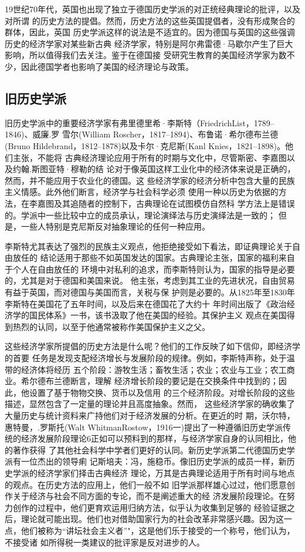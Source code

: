 19世纪70年代，英国也出现了独立于德国历史学派的对正统经典理论的批评，以及对所谓
的历史方法的提倡。然而，历史方法的这些英国提倡者，没有形成聚合的群体，因此，英国
历史学派这样的说法是不适宜的。因为德国与英国的这些强调历史的经济学家对某些新古典
经济学家，特别是阿尔弗雷德·马歇尔产生了巨大影响，所以值得我们去关注。鉴于在德国接
受研究生教育的美国经济学家为数不少，因此德国学者也影响了美国的经济理论与政策。

\subsection{旧历史学派}

旧历史学派中的重要经济学家有弗里德里希·李斯特（FriedrichList，1789--1846)、威廉.罗
雪尔(William Roscher，1817--1894)、布鲁诺·希尔德布兰德(Bruno
Hildebrand，1812--1878)以及卡尔·克尼斯(Kanl Knies，1821--1898)。他们主张，不能将
古典经济理论应用于所有的时期与文化中，尽管斯密、李嘉图以及约翰.斯图亚特·穆勒的结
论对于像英国这样工业化中的经济体来说是正确的，然而，并不能应用于农业化的德国。这
些经济学家的经济分析中包含大量的民族主义情感。此外他们断言，经济学与社会科学必须
使用一种以历史为依据的方法，在李嘉图及其追随者的控制下，古典理论在试图模仿自然科
学方法上是错误的。学派中一些比较中立的成员承认，理论演绎法与历史演绎法是一致的；
但是，一些人特别是克尼斯反对抽象理论的任何一种应用。

李斯特尤其表达了强烈的民族主义观点，他拒绝接受如下看法，即证典理论关于自由放任的
结论适用于那些不如英国发达的国家。古典理论主张，国家的福利来自于个人在自由放任的
环境中对私利的追求，而李斯特则认为，国家的指导是必要的，尤其是对于德国和美国来说。
他主张，考虑到其工业的先进状况，自由贸易有益于英国，而对德国与美国而言，关税与保
护则是必要的。从1825年至1830年李斯特在美国花了五年时间，以及后来在德国花了大约十
年时间出版了《政治经济学的国民体系》一书，该书汲取了他在美国的经验。其保护主义
观点在美国得到热烈的认同，以至于他通常被称作美国保护主义之父。

这些经济学家所提倡的历史方法是什么呢？他们的工作反映了如下信仰，即经济学的首要
任务是发现支配经济增长与发展阶段的规律。例如，李斯特声称，处于温带的经济体将经历
五个阶段：游牧生活；畜牧生活；农业；农业与工业；农工商业。希尔德布兰德断言，理解
经济增长阶段的要记是在交换条件中找到的；因此，他设置了基于物物交换、货币以及信用
的三个经济阶段。对增长阶段的这些描述，显然包含了一定量的理论并且高度抽象。然而，
这些经济学家的确收集了大量历史与统计资料来广持他们对于经济发展的分析。在更近的时
期，沃尔特，惠特曼，.罗斯托(Walt WhitmanRostow，1916一)提出了一种遵循旧历史学派传
统的经济发展阶段理论6正如可以预料到的那样，与经济学家自身的认同相比，他的著作获得
了其他社会科学中学者们更好的认同。新历史学派第二代德国历史学派有一位杰出的领导痢
记斯培夫：冯，施稳币。像旧历史学派的成员一样，新历史学派的经济学家们择击古典经济
理论，万其是古典理论适用于所有时间与地点的观点。在历史方法的应用上，他们一般不如
旧学派那样雄心过过，他们愿意创作关于经济与社会不同方面的专论，而不是阐述重大的经
济发展阶段理论。在努力创作的过程中，他们更育欢运用归纳方法，似乎认为收集到足够的
经验证据之后，理论就可能出现。他们也对借助国家行为的社会改革非常感兴趣。因为这一
点，他们被称为“讲坛社会主义者”"，这是他们乐于接受的一个称号，他们认为，不接受诸
如所得税一类建议的批评家是反对进步的人。

